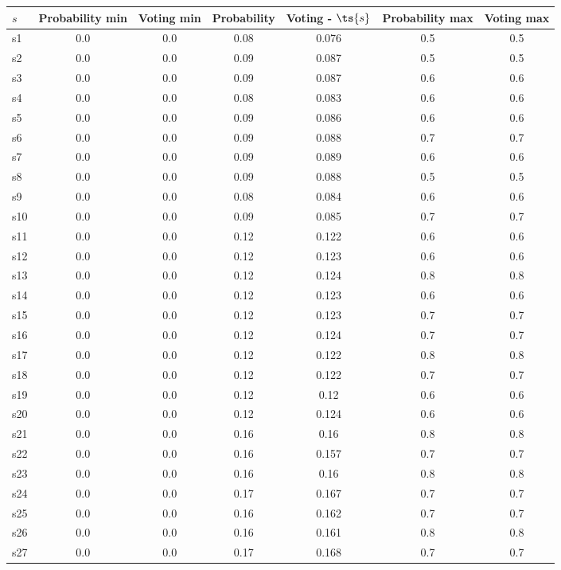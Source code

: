 \documentclass{article}
\begin{document}
\noindent\begin{tabular}{|l|c|c|c|c|c|c|}
\hline
$s$& Probability min & Voting min & Probability & Voting - $\ts{s}$ & Probability max & Voting max\\
\hline
s1 &0.0 & 0.0 & 0.08 & 0.076 & 0.5 & 0.5\\
\hline
s2 &0.0 & 0.0 & 0.09 & 0.087 & 0.5 & 0.5\\
\hline
s3 &0.0 & 0.0 & 0.09 & 0.087 & 0.6 & 0.6\\
\hline
s4 &0.0 & 0.0 & 0.08 & 0.083 & 0.6 & 0.6\\
\hline
s5 &0.0 & 0.0 & 0.09 & 0.086 & 0.6 & 0.6\\
\hline
s6 &0.0 & 0.0 & 0.09 & 0.088 & 0.7 & 0.7\\
\hline
s7 &0.0 & 0.0 & 0.09 & 0.089 & 0.6 & 0.6\\
\hline
s8 &0.0 & 0.0 & 0.09 & 0.088 & 0.5 & 0.5\\
\hline
s9 &0.0 & 0.0 & 0.08 & 0.084 & 0.6 & 0.6\\
\hline
s10 &0.0 & 0.0 & 0.09 & 0.085 & 0.7 & 0.7\\
\hline
s11 &0.0 & 0.0 & 0.12 & 0.122 & 0.6 & 0.6\\
\hline
s12 &0.0 & 0.0 & 0.12 & 0.123 & 0.6 & 0.6\\
\hline
s13 &0.0 & 0.0 & 0.12 & 0.124 & 0.8 & 0.8\\
\hline
s14 &0.0 & 0.0 & 0.12 & 0.123 & 0.6 & 0.6\\
\hline
s15 &0.0 & 0.0 & 0.12 & 0.123 & 0.7 & 0.7\\
\hline
s16 &0.0 & 0.0 & 0.12 & 0.124 & 0.7 & 0.7\\
\hline
s17 &0.0 & 0.0 & 0.12 & 0.122 & 0.8 & 0.8\\
\hline
s18 &0.0 & 0.0 & 0.12 & 0.122 & 0.7 & 0.7\\
\hline
s19 &0.0 & 0.0 & 0.12 & 0.12 & 0.6 & 0.6\\
\hline
s20 &0.0 & 0.0 & 0.12 & 0.124 & 0.6 & 0.6\\
\hline
s21 &0.0 & 0.0 & 0.16 & 0.16 & 0.8 & 0.8\\
\hline
s22 &0.0 & 0.0 & 0.16 & 0.157 & 0.7 & 0.7\\
\hline
s23 &0.0 & 0.0 & 0.16 & 0.16 & 0.8 & 0.8\\
\hline
s24 &0.0 & 0.0 & 0.17 & 0.167 & 0.7 & 0.7\\
\hline
s25 &0.0 & 0.0 & 0.16 & 0.162 & 0.7 & 0.7\\
\hline
s26 &0.0 & 0.0 & 0.16 & 0.161 & 0.8 & 0.8\\
\hline
s27 &0.0 & 0.0 & 0.17 & 0.168 & 0.7 & 0.7\\

\end{tabular}
\end{document}
